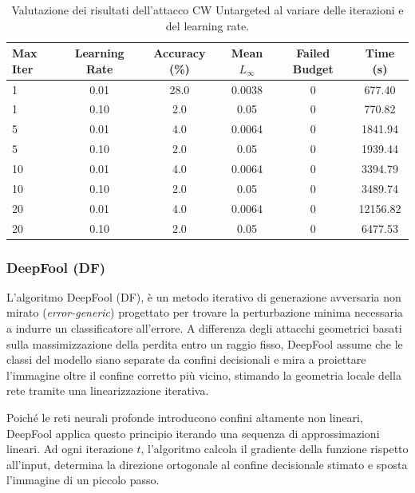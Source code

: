 \documentclass[a4paper, 12pt]{article}
\begin{document}
\begin{table}[h]
    \centering
    \small
    \setlength{\tabcolsep}{4pt}
    \begin{tabular}{@{}lccccc@{}}
        \toprule
        \textbf{Max Iter} & \textbf{Learning Rate} & \textbf{Accuracy (\%)} & \textbf{Mean $L_\infty$} & \textbf{Failed Budget} & \textbf{Time (s)} \\
        \midrule
        1  & 0.01 & 28.0 & 0.0038 & 0 & 677.40 \\
        1  & 0.10 & 2.0  & 0.05 & 0 & 770.82 \\
        5  & 0.01 & 4.0  & 0.0064 & 0 & 1841.94 \\
        5  & 0.10 & 2.0  & 0.05 & 0 & 1939.44 \\
        10 & 0.01 & 4.0  & 0.0064 & 0 & 3394.79 \\
        10 & 0.10 & 2.0  & 0.05 & 0 & 3489.74 \\
        20 & 0.01 & 4.0  & 0.0064 & 0 & 12156.82 \\
        20 & 0.10 & 2.0  & 0.05 & 0 & 6477.53 \\
        \bottomrule
    \end{tabular}
    \caption{Valutazione dei risultati dell'attacco CW Untargeted al variare delle iterazioni e del learning rate.}
    \label{tab:CW_Untargeted_robustness}
\end{table}

\vspace{10pt}

\subsubsection{DeepFool (DF)}
L'algoritmo DeepFool (DF), è un metodo iterativo di generazione avversaria non mirato (\textit{error-generic}) progettato per trovare la perturbazione minima necessaria a indurre un classificatore all'errore. A differenza degli attacchi geometrici basati sulla massimizzazione della perdita entro un raggio fisso, DeepFool assume che le classi del modello siano separate da confini decisionali e mira a proiettare l'immagine oltre il confine corretto più vicino, stimando la geometria locale della rete tramite una linearizzazione iterativa.

Poiché le reti neurali profonde introducono confini altamente non lineari, DeepFool applica questo principio iterando una sequenza di approssimazioni lineari. Ad ogni iterazione $t$, l'algoritmo calcola il gradiente della funzione rispetto all'input, determina la direzione ortogonale al confine decisionale stimato e sposta l'immagine di un piccolo passo. 
\end{document}
